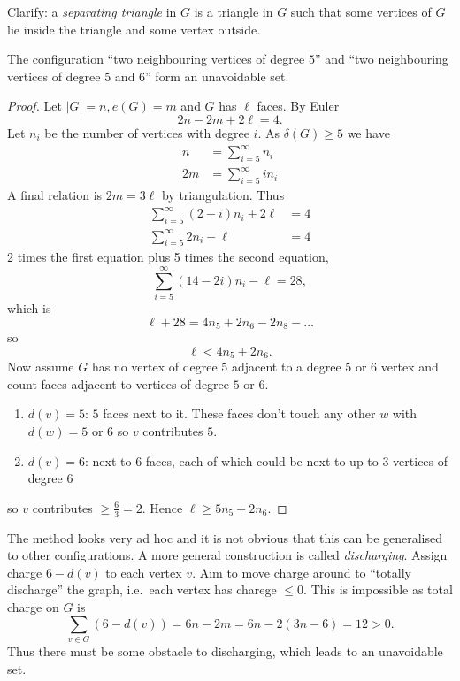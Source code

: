\documentclass[a4paper]{article}
\begin{document}
Clarify: a \emph{separating triangle} in \(G\) is a triangle in \(G\) such that some vertices of \(G\) lie inside the triangle and some vertex outside.

\begin{eg}
  The configuration ``two neighbouring vertices of degree \(5\)'' and ``two neighbouring vertices of degree \(5\) and \(6\)'' form an unavoidable set.

  \begin{proof}
    Let \(|G| = n, e(G) = m\) and \(G\) has \(\ell\) faces. By Euler
    \[
      2n - 2m + 2\ell = 4.
    \]
    Let \(n_i\) be the number of vertices with degree \(i\). As \(\delta(G) \geq 5\) we have
    \begin{align*}
      n &= \sum_{i = 5}^\infty n_i \\
      2m &= \sum_{i = 5}^\infty i n_i
    \end{align*}
    A final relation is \(2m = 3\ell\) by triangulation. Thus
    \begin{align*}
      \sum_{i = 5}^\infty (2 - i) n_i + 2\ell &= 4 \\
      \sum_{i = 5}^\infty 2n_i - \ell &= 4
    \end{align*}
    2 times the first equation plus 5 times the second equation,
    \[
      \sum_{i = 5}^\infty (14 - 2i)n_i - \ell = 28,
    \]
    which is
    \[
      \ell + 28 = 4n_5 + 2n_6 - 2n_8 - \dots
    \]
    so
    \[
      \ell < 4n_5 + 2n_6.
    \]
    Now assume \(G\) has no vertex of degree \(5\) adjacent to a degree \(5\) or \(6\) vertex and count faces adjacent to vertices of degree \(5\) or \(6\).
    \begin{enumerate}
    \item \(d(v) = 5\): \(5\) faces next to it. These faces don't touch any other \(w\) with \(d(w) = 5\) or \(6\) so \(v\) contributes \(5\).
    \item \(d(v) = 6\): next to \(6\) faces, each of which could be next to up to \(3\) vertices of degree 6
    \end{enumerate}
    so \(v\) contributes \(\geq \frac{6}{3} = 2\). Hence \(\ell \geq 5n_5 + 2n_6\).
  \end{proof}
\end{eg}

The method looks very ad hoc and it is not obvious that this can be generalised to other configurations. A more general construction is called \emph{discharging}. Assign charge \(6 - d(v)\) to each vertex \(v\). Aim to move charge around to ``totally discharge'' the graph, i.e.\ each vertex has charege \(\leq 0\). This is impossible as total charge on \(G\) is
\[
  \sum_{v \in G} (6 - d(v)) = 6n - 2m = 6n - 2(3n - 6) = 12 > 0.
\]
Thus there must be some obstacle to discharging, which leads to an unavoidable set.
\end{document}
